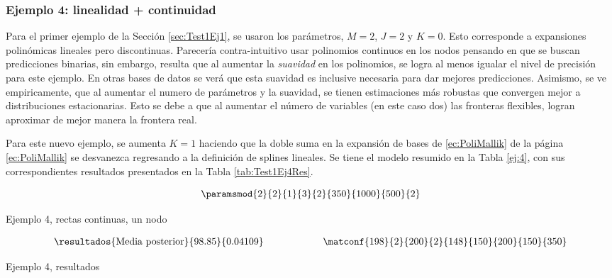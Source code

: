 \subsubsection*{Ejemplo 4: linealidad + continuidad}
Para el primer ejemplo de la Sección \ref{sec:Test1Ej1}, se usaron los parámetros, $M = 2$, $J = 2$ y $K = 0$. Esto corresponde a expansiones polinómicas lineales pero discontinuas. Parecería contra-intuitivo usar polinomios continuos en los nodos pensando en que se buscan predicciones binarias, sin embargo, resulta que al aumentar la \textit{suavidad} en los polinomios, se logra al menos igualar el nivel de precisión para este ejemplo. En otras bases de datos se verá que esta suavidad es inclusive necesaria para dar mejores predicciones. Asimismo, se ve empiricamente, que al aumentar el numero de parámetros y la suavidad, se tienen estimaciones más robustas que convergen mejor a distribuciones estacionarias. Esto se debe a que al aumentar el número de variables (en este caso dos) las fronteras flexibles, logran aproximar de mejor manera la frontera real. 

Para este nuevo ejemplo, se aumenta $K = 1$ haciendo que la doble suma en la expansión de bases de \ref{ec:PoliMallik} de la página \ref{ec:PoliMallik} se desvanezca regresando a la definición de splines lineales. Se tiene el modelo resumido en la Tabla \ref{ej:4}, con sus correspondientes resultados presentados en la Tabla \ref{tab:Test1Ej4Res}. 

\begin{table}[h]
$$\paramsmod{2}{2}{1}{3}{2}{350}{1000}{500}{2}$$
\caption{Ejemplo 4, rectas continuas, un nodo}
\label{ej:4}
\end{table}

\begin{table}[h]
\begin{align*}
\resultados{\text{Media posterior}}{98.85}{0.04109}
\qquad\qquad\qquad
\matconf{198}{2}{200}{2}{148}{150}{200}{150}{350}
\end{align*}
\caption{Ejemplo 4, resultados}
\label{tab:Test1Ej4Res}
\end{table}

